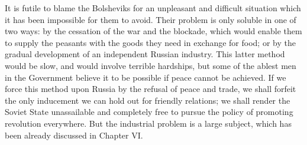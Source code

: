 It is futile to blame the Bolsheviks for an unpleasant and difficult situation which it has been impossible for them to avoid. Their problem is only soluble in one of two ways: by the cessation of the war and the blockade, which would enable them to supply the peasants with the goods they need in exchange for food; or by the gradual development of an independent Russian industry. This latter method would be slow, and would involve terrible hardships, but some of the ablest men in the Government believe it to be possible if peace cannot be achieved. If we force this method upon Russia by the refusal of peace and trade, we shall forfeit the only inducement we can hold out for friendly relations; we shall render the Soviet State unassailable and completely free to pursue the policy of promoting revolution everywhere. But the industrial problem is a large subject, which has been already discussed in Chapter VI.